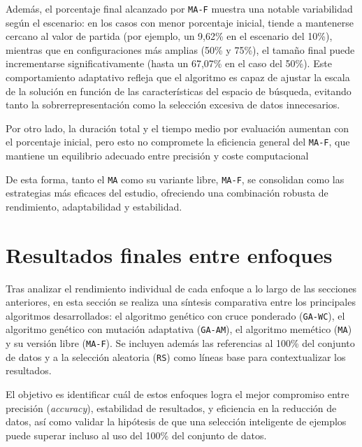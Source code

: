 Además, el porcentaje final alcanzado por \texttt{MA-F} muestra una notable variabilidad según el escenario:
en los casos con menor porcentaje inicial, tiende a mantenerse cercano al valor de partida (por ejemplo, un 9,62\% en el escenario del 10\%),
mientras que en configuraciones más amplias (50\% y 75\%), el tamaño final puede incrementarse significativamente (hasta un 67,07\% en el caso del 50\%).
Este comportamiento adaptativo refleja que el algoritmo es capaz de ajustar la escala de la solución en función de las características del espacio de búsqueda,
evitando tanto la sobrerrepresentación como la selección excesiva de datos innecesarios.

Por otro lado, la duración total y el tiempo medio por evaluación aumentan con el porcentaje inicial, pero esto no compromete la eficiencia general del \texttt{MA-F},
que mantiene un equilibrio adecuado entre precisión y coste computacional

De esta forma, tanto el \texttt{MA} como su variante libre, \texttt{MA-F}, se consolidan como las estrategias más eficaces del estudio,
ofreciendo una combinación robusta de rendimiento, adaptabilidad y estabilidad.


\section{Resultados finales entre enfoques}\label{sec:comparacion-final-enfoques}
Tras analizar el rendimiento individual de cada enfoque a lo largo de las secciones anteriores,
en esta sección se realiza una síntesis comparativa entre los principales algoritmos desarrollados: el algoritmo genético con cruce ponderado (\texttt{GA-WC}), el algoritmo genético con mutación adaptativa (\texttt{GA-AM}), el algoritmo memético (\texttt{MA}) y su versión libre (\texttt{MA-F}).
Se incluyen además las referencias al 100\% del conjunto de datos y a la selección aleatoria (\texttt{RS})
como líneas base para contextualizar los resultados.

El objetivo es identificar cuál de estos enfoques logra el mejor compromiso entre precisión (\textit{accuracy}),
estabilidad de resultados, y eficiencia en la reducción de datos, así como validar la hipótesis de que una selección inteligente de ejemplos puede superar incluso al uso del 100\% del conjunto de datos.

